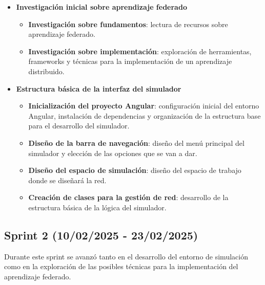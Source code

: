\begin{itemize}
    \item \textbf{Investigación inicial sobre aprendizaje federado}
    \begin{itemize}
        \item \textbf{Investigación sobre fundamentos}: lectura de recursos sobre aprendizaje federado.
        \item \textbf{Investigación sobre implementación}: exploración de herramientas, frameworks y técnicas para la implementación de un aprendizaje distribuido.
    \end{itemize}
    \item \textbf{Estructura básica de la interfaz del simulador}
    \begin{itemize}
        \item \textbf{Inicialización del proyecto Angular}: configuración inicial del entorno Angular, instalación de dependencias y organización de la estructura base para el desarrollo del simulador.
        \item \textbf{Diseño de la barra de navegación}: diseño del menú principal del simulador y elección de las opciones que se van a dar.
        \item \textbf{Diseño del espacio de simulación}: diseño del espacio de trabajo donde se diseñará la red.
        \item \textbf{Creación de clases para la gestión de red}: desarrollo de la estructura básica de la lógica del simulador.
    \end{itemize}
\end{itemize}

\subsection{Sprint 2 (10/02/2025 - 23/02/2025)}
\label{subsec:SegundoSprint}
Durante este sprint se avanzó tanto en el desarrollo del entorno de simulación como en la exploración de las posibles técnicas para la implementación del aprendizaje federado.

